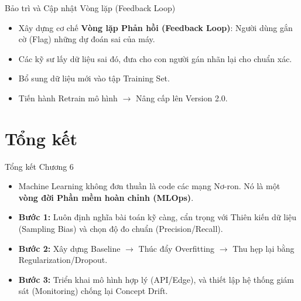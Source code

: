\documentclass[aspectratio=169]{beamer}
\begin{document}
\begin{frame}{Bảo trì và Cập nhật Vòng lặp (Feedback Loop)}
    \begin{itemize}
        \item Xây dựng cơ chế \textbf{Vòng lặp Phản hồi (Feedback Loop)}: Người dùng gắn cờ (Flag) những dự đoán sai của máy.
        \item Các kỹ sư lấy dữ liệu sai đó, đưa cho con người gán nhãn lại cho chuẩn xác.
        \item Bổ sung dữ liệu mới vào tập Training Set.
        \item Tiến hành Retrain mô hình $\rightarrow$ Nâng cấp lên Version 2.0.
    \end{itemize}
\end{frame}

\section{Tổng kết}

\begin{frame}{Tổng kết Chương 6}
    \begin{itemize}
        \item Machine Learning không đơn thuần là code các mạng Nơ-ron. Nó là một \textbf{vòng đời Phần mềm hoàn chỉnh (MLOps)}.
        \item \textbf{Bước 1:} Luôn định nghĩa bài toán kỹ càng, cẩn trọng với Thiên kiến dữ liệu (Sampling Bias) và chọn độ đo chuẩn (Precision/Recall).
        \item \textbf{Bước 2:} Xây dựng Baseline $\rightarrow$ Thúc đẩy Overfitting $\rightarrow$ Thu hẹp lại bằng Regularization/Dropout.
        \item \textbf{Bước 3:} Triển khai mô hình hợp lý (API/Edge), và thiết lập hệ thống giám sát (Monitoring) chống lại Concept Drift.
    \end{itemize}
\end{frame}
\end{document}
